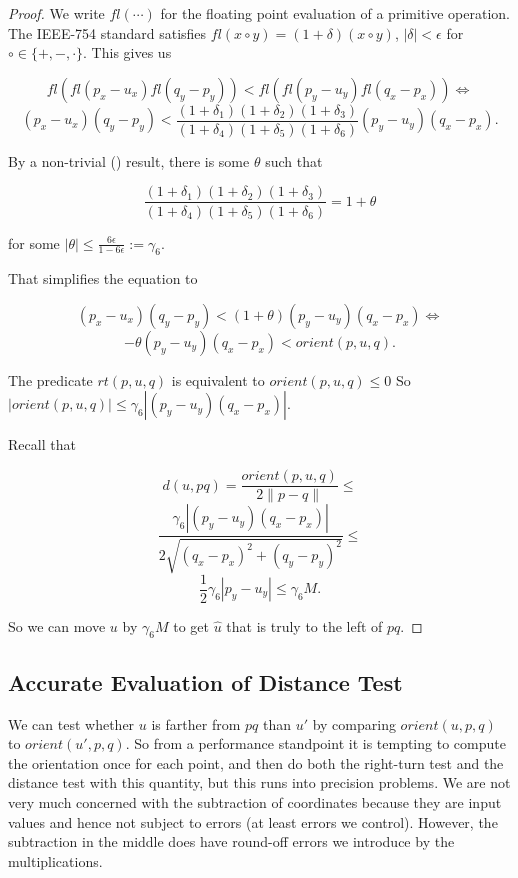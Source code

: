 \begin{proof}
    We write $fl(\cdots)$ for the floating point evaluation of a primitive 
    operation. The IEEE-754 standard satisfies 
    $fl(x \circ y) = (1 + \delta)(x \circ y)$, $|\delta| < \epsilon$ for
    $\circ \in \{+, -, \cdot\}$. This gives us

    $$fl(fl(p_x - u_x) fl(q_y - p_y)) < 
            fl(fl(p_y - u_y) fl(q_x - p_x)) \iff$$
    $$(p_x - u_x) (q_y - p_y) < \frac{(1 + \delta_1)(1 + \delta_2)(1 + \delta_3)}
    {(1 + \delta_4)(1 + \delta_5)(1 + \delta_6)} (p_y - u_y) (q_x - p_x).$$

    By a non-trivial () result, there is some $\theta$
    such that

    $$\frac{(1 + \delta_1)(1 + \delta_2)(1 + \delta_3)}{(1 + \delta_4)(1 + \delta_5)(1 + \delta_6)} = 1 + \theta$$

    for some $|\theta| \leq \frac{6\epsilon}{1 - 6\epsilon} := \gamma_6$.

    That simplifies the equation to

    $$(p_x - u_x) (q_y - p_y) < (1 + \theta) (p_y - u_y) (q_x - p_x) \iff$$
    $$-\theta (p_y - u_y) (q_x - p_x) < orient(p, u, q).$$

    The predicate $rt(p, u, q)$ is equivalent to $orient(p, u, q) \leq 0$
    So $|orient(p, u, q)| \leq \gamma_6 |(p_y - u_y) (q_x - p_x)|$.

    Recall that 

    $$d(u, pq) = \frac{orient(p, u, q)}{2 \lVert p - q \rVert} \leq$$
    $$\frac{\gamma_6 |(p_y - u_y) (q_x - p_x)|}{2 \sqrt{(q_x - p_x)^2 + (q_y - p_y)^2}} \leq$$
    $$\frac{1}{2}\gamma_6 |p_y - u_y| \leq \gamma_6 M.$$

    So we can move $u$ by $\gamma_6 M$ to get $\hat{u}$ that is truly to the 
    left of $pq$.
\end{proof}

\subsection{Accurate Evaluation of Distance Test}

We can test whether $u$ is farther from $pq$ than $u'$ by comparing
$orient(u, p, q)$ to $orient(u', p, q)$. So from a performance standpoint it
is tempting to compute the orientation once for each point, and then do both
the right-turn test and the distance test with this quantity, but this
runs into precision problems. We are not very much concerned with the
subtraction of coordinates because they are input values and hence not
subject to errors (at least errors we control). However, the subtraction 
in the middle does have round-off errors we introduce by the multiplications.

